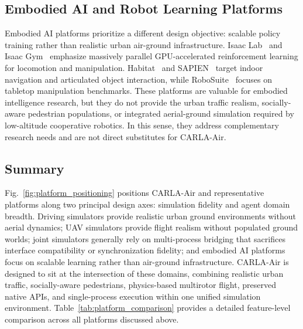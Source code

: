 \subsection{Embodied AI and Robot Learning Platforms}
\label{sec:related:embodied}

Embodied AI platforms prioritize a different design objective: scalable policy
training rather than realistic urban air-ground infrastructure.
Isaac Lab~\cite{isaaclab} and Isaac Gym~\cite{isaacgym} emphasize massively
parallel GPU-accelerated reinforcement learning for locomotion and
manipulation.
Habitat~\cite{habitat} and SAPIEN~\cite{sapien} target indoor navigation and
articulated object interaction, while RoboSuite~\cite{robosuite} focuses on
tabletop manipulation benchmarks.
These platforms are valuable for embodied intelligence research, but they do
not provide the urban traffic realism, socially-aware pedestrian populations,
or integrated aerial-ground simulation required by low-altitude cooperative
robotics.
In this sense, they address complementary research needs and are not direct
substitutes for CARLA-Air.

\subsection{Summary}
\label{sec:related:summary}

Fig.~\ref{fig:platform_positioning} positions CARLA-Air and representative
platforms along two principal design axes: simulation fidelity and agent domain
breadth.
Driving simulators provide realistic urban ground environments without aerial
dynamics; UAV simulators provide flight realism without populated ground
worlds; joint simulators generally rely on multi-process bridging that
sacrifices interface compatibility or synchronization fidelity; and embodied AI
platforms focus on scalable learning rather than air-ground infrastructure.
CARLA-Air is designed to sit at the intersection of these domains, combining
realistic urban traffic, socially-aware pedestrians, physics-based multirotor
flight, preserved native APIs, and single-process execution within one unified
simulation environment.
Table~\ref{tab:platform_comparison} provides a detailed feature-level comparison
across all platforms discussed above.



